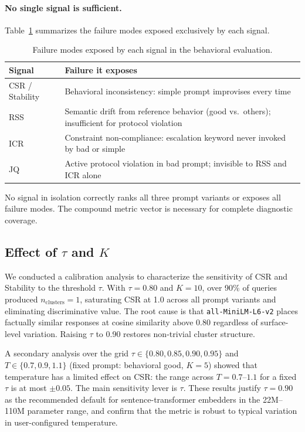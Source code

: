 \documentclass[11pt,a4paper]{article}
\begin{document}
\paragraph{No single signal is sufficient.}
Table~\ref{tab:failures} summarizes the failure modes exposed exclusively by each signal.

\begin{table}[h]
\centering
\caption{Failure modes exposed by each signal in the behavioral evaluation.}
\label{tab:failures}
\begin{tabular}{lp{8.5cm}}
\toprule
Signal & Failure it exposes \\
\midrule
CSR / Stability & Behavioral inconsistency: simple prompt improvises every time \\
RSS             & Semantic drift from reference behavior (good vs.\ others); insufficient for protocol violation \\
ICR             & Constraint non-compliance: escalation keyword never invoked by bad or simple \\
JQ              & Active protocol violation in bad prompt; invisible to RSS and ICR alone \\
\bottomrule
\end{tabular}
\end{table}

\noindent No signal in isolation correctly ranks all three prompt variants or exposes all failure modes. The compound metric vector is necessary for complete diagnostic coverage.

\subsection{Effect of $\tau$ and $K$}
\label{sec:tau_k}

We conducted a calibration analysis to characterize the sensitivity of CSR and Stability to the threshold $\tau$. With $\tau = 0.80$ and $K = 10$, over 90\% of queries produced $n_\mathrm{clusters} = 1$, saturating CSR at 1.0 across all prompt variants and eliminating discriminative value. The root cause is that \texttt{all-MiniLM-L6-v2} places factually similar responses at cosine similarity above 0.80 regardless of surface-level variation. Raising $\tau$ to 0.90 restores non-trivial cluster structure.

A secondary analysis over the grid $\tau \in \{0.80, 0.85, 0.90, 0.95\}$ and $T \in \{0.7, 0.9, 1.1\}$ (fixed prompt: behavioral good, $K = 5$) showed that temperature has a limited effect on CSR: the range across $T = 0.7$--$1.1$ for a fixed $\tau$ is at most $\pm 0.05$. The main sensitivity lever is $\tau$. These results justify $\tau = 0.90$ as the recommended default for sentence-transformer embedders in the 22M--110M parameter range, and confirm that the metric is robust to typical variation in user-configured temperature.
\end{document}
